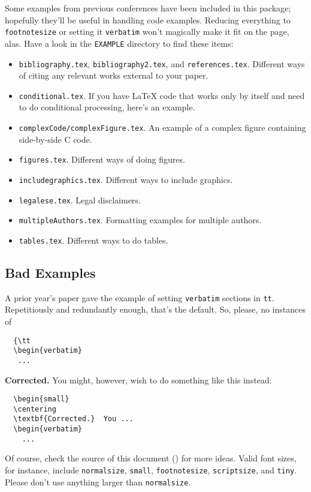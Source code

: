 \documentclass[final]{ols}
\begin{document}
Some examples from previous conferences have been included
in this package; hopefully they'll be useful in handling code
examples.  Reducing everything to \texttt{footnotesize} or setting it
\texttt{verbatim} won't magically make it fit on the page, alas.  Have
a look in the \texttt{EXAMPLE} directory to find these items:
\begin{itemize}
\item {\raggedright \texttt{\small bibli\-og\-raphy.tex}, \texttt{\small bibli\-og\-ra\-phy2.tex}, and
  \texttt{\small ref\-er\-ences.tex}.  Different ways of citing any relevant
  works external to your paper.}
\item \texttt{conditional.tex}.  If you have {\LaTeX} code that works
  only by itself and need to do conditional processing, here's an example.
\item \texttt{\small complexCode/complexFigure.tex}.  An example of a complex
  figure containing side-by-side C code.
\item \texttt{figures.tex}.  Different ways of doing figures.
\item \texttt{includegraphics.tex}.  Different ways to include graphics.
\item \texttt{legalese.tex}.  Legal disclaimers.
\item \texttt{multipleAuthors.tex}.  Formatting examples for multiple authors.
\item \texttt{tables.tex}.  Different ways to do tables.
\end{itemize}

\subsection{Bad Examples}

A prior year's paper gave the example of setting \texttt{verbatim}
sections in \texttt{tt}.  Repetitiously and redundantly enough, that's
the default.  So, please, no instances of
\begin{verbatim}
  {\tt
  \begin{verbatim}
   ...
\end{verbatim}

\begin{small}
\centering
\textbf{Corrected.}  You might, however, wish to do something like this instead:
\begin{verbatim}
  \begin{small}
  \centering
  \textbf{Corrected.}  You ...
  \begin{verbatim}
    ...
\end{verbatim}
\end{small}
Of course, check the source of this document
() for more ideas.  Valid font sizes, for
instance, include \texttt{normalsize}, \texttt{small},
\texttt{footnotesize}, \texttt{scriptsize}, and \texttt{tiny}.  Please
don't use anything larger than \texttt{normalsize}.
\end{document}
